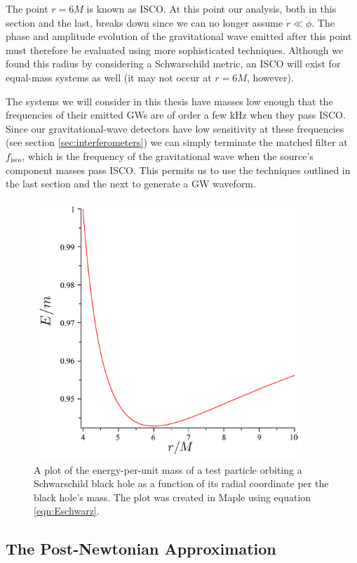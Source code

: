 The point $r=6M$ is known as \ac{ISCO}. At this point our analysis, both in this section and the last, breaks down since we can no longer assume $\dot{r} \ll \dot{\phi}$. The phase and amplitude evolution of the gravitational wave emitted after this point must therefore be evaluated using more sophisticated techniques. Although we found this radius by considering a Schwarschild metric, an \ac{ISCO} will exist for equal-mass systems as well (it may not occur at $r=6M$, however).

The systems we will consider in this thesis have masses low enough that the frequencies of their emitted \acp{GW} are of order a few kHz when they pass \ac{ISCO}. Since our gravitational-wave detectors have low sensitivity at these frequencies (see section \ref{sec:interferometers}) we can simply terminate the matched filter at $f_{\mathrm{isco}}$, which is the frequency of the gravitational wave when the source's component masses pass \ac{ISCO}. This permits us to use the techniques outlined in the last section and the next to generate a \ac{GW} waveform.

\begin{figure}[tbp]
\center
\includegraphics[width=4in]{figures/Eofrplot.pdf}
\caption{A plot of the energy-per-unit mass of a test particle orbiting a Schwarschild black hole as a function of its radial coordinate per the black hole's mass. The plot was created in Maple using equation \ref{eqn:Eschwarz}.}
\label{fig:Eofr}
\end{figure}

\subsection{The Post-Newtonian Approximation}

